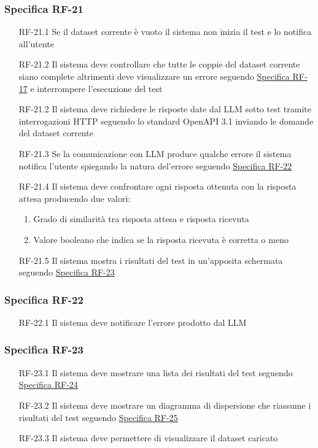 \subsubsection{Specifica RF-21}
\label{subsubsec:RF-21}
\begin{enumerate}
    \item[RF-21.1] Se il dataset corrente è vuoto il sistema non inizia il test e lo notifica all'utente
    \item[RF-21.2] Il sistema deve controllare che tutte le coppie del dataset corrente siano complete altrimenti deve visualizzare un errore seguendo \hyperref[subsubsec:RF-17]{Specifica RF-17} e interrompere l'esecuzione del test
    \item[RF-21.2] Il sistema deve richiedere le risposte date dal LLM sotto test tramite interrogazioni HTTP seguendo lo standard OpenAPI 3.1 inviando le domande del dataset corrente
    \item[RF-21.3] Se la comunicazione con LLM produce qualche errore il sistema notifica l'utente spiegando la natura del'errore seguendo \hyperref[subsubsec:RF-22]{Specifica RF-22}
    \item[RF-21.4] Il sistema deve confrontare ogni risposta ottenuta con la risposta attesa producendo due valori:
    \begin{enumerate}
        \item Grado di similarità tra risposta attesa e risposta ricevuta
        \item Valore booleano che indica se la risposta ricevuta è corretta o meno
    \end{enumerate}
    \item[RF-21.5] Il sistema mostra i risultati del test in un'apposita schermata seguendo \hyperref[subsubsec:RF-23]{Specifica RF-23}
\end{enumerate}

\subsubsection{Specifica RF-22}
\label{subsubsec:RF-22}
\begin{enumerate}
    \item[RF-22.1] Il sistema deve notificare l'errore prodotto dal LLM
\end{enumerate}

\subsubsection{Specifica RF-23}
\label{subsubsec:RF-23}
\begin{enumerate}
    \item[RF-23.1] Il sistema deve mostrare una lista dei risultati del test seguendo \hyperref[subsubsec:RF-24]{Specifica RF-24}
    \item[RF-23.2] Il sistema deve mostrare un diagramma di dispersione che riassume i risultati del test seguendo \hyperref[subsubsec:RF-25]{Specifica RF-25}
    \item[RF-23.3] Il sistema deve permettere di visualizzare il dataset caricato
\end{enumerate}

